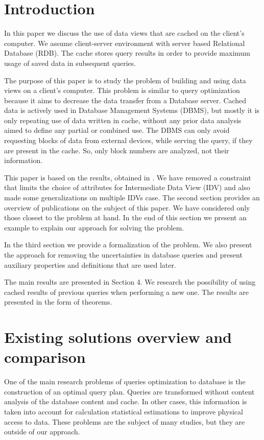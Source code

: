 \documentclass[preprint,12pt]{elsarticle}
\begin{document}

\section{Introduction}
In this paper we discuss the use of data views that are
cached on the client's computer. We assume client-server environment with
server based Relational Database (RDB). The cache stores query results in order
to provide maximum usage of saved data in subsequent queries.

The purpose of this paper is to study the problem of building and using data
views on a client's computer. This problem is similar to query optimization
because it aims to decrease the data transfer from a Database server. Cached
data is actively used in Database Management Systems (DBMS), but mostly it is
only repeating use of data written in cache, without any prior data analysis
aimed to define any partial or combined use. The DBMS can only avoid requesting
blocks of data from external devices, while serving the query, if they are
present in the cache. So, only block numbers are analyzed, not their information.

This paper is based on the results, obtained in \cite{zyk_pol}. We have removed
a constraint that limits the choice of attributes for Intermediate Data View
(IDV) and also made some generalizations on multiple IDVs case.
\cite{codd}
The second section provides an overview of publications on the subject of this
paper. We have considered only those closest to the problem at hand. In the end
of this section we present an example to explain our approach for solving the
problem.

In the third section we provide a formalization of the problem. We also present
the approach for removing the uncertainties in database queries and present
auxiliary properties and definitions that are used later.

The main results are presented in Section 4. We research the possibility of
using cached results of previous queries when performing a new one. The results
are presented in the form of theorems.

\section{Existing solutions overview and comparison}
One of the main research problems of queries optimization to database is the
construction of an optimal query plan. Queries are transformed without content
analysis of the database content and cache. In other cases, this information is
taken into account for calculation statistical estimations to improve physical
access to data. These problems are the subject of many studies, but they are
outside of our approach.
\end{document}
